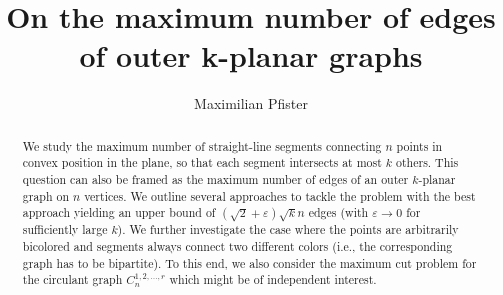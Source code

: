 \documentclass[nolineno,a4paper,USenglish,cleveref,autoref,thm-restate]
{socg}
\title{On the maximum number of edges of outer k-planar graphs}
\author{Maximilian Pfister}{Universit{\"a}t T{\"u}bingen}{maximilian.pfister@uni-tuebingen.de}{https://orcid.org/0000-0002-7203-0669}{This research was supported by the DFG grant SCHL 2331/1-1}
\begin{document}
\maketitle
\begin{abstract}
We study the maximum number of straight-line segments connecting $n$ points in convex
position in the plane, so that
each segment intersects at most $k$ others. This question can also be framed as the maximum number of edges of an outer $k$-planar graph on $n$ vertices. We outline several approaches to tackle the problem with the best approach yielding an upper bound of $(\sqrt{2}+\varepsilon)\sqrt{k}n$ edges (with $\varepsilon \rightarrow 0$ for sufficiently large $k$).
We further investigate the case where the points are arbitrarily bicolored and segments always connect two different colors (i.e., the corresponding graph has to be bipartite). To this end, we also consider the maximum cut problem for the circulant graph $C_n^{1,2,\dots,r}$ which might be of independent interest.
\end{abstract}
\end{document}
